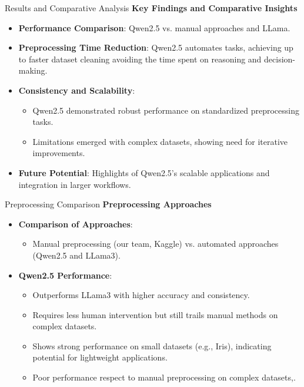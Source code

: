 \documentclass{beamer}
\begin{document}
\begin{frame}{Results and Comparative Analysis}
    \textbf{\textcolor{myBlue}{Key Findings and Comparative Insights}}
    \vspace{0.3cm}
    \begin{itemize}
        \item \textbf{Performance Comparison}: Qwen2.5 vs. manual approaches and LLama.
        \item \textbf{\textcolor{myAccent}{Preprocessing Time Reduction}}: Qwen2.5 automates tasks, achieving up to faster dataset cleaning avoiding the time spent on reasoning and decision-making.
        \item \textbf{\textcolor{myAccent}{Consistency and Scalability}}:
            \begin{itemize}
                \item Qwen2.5 demonstrated robust performance on standardized preprocessing tasks.
                \item Limitations emerged with complex datasets, showing need for iterative improvements.
            \end{itemize}
        \item \textbf{Future Potential}: Highlights of Qwen2.5's scalable applications and integration in larger workflows.
    \end{itemize}
\end{frame}

\begin{frame}{Preprocessing Comparison}
    \textbf{\textcolor{myBlue}{Preprocessing Approaches}}
    \vspace{0.3cm}
    \begin{itemize}
        \item \textbf{Comparison of Approaches}:
            \begin{itemize}
                \item Manual preprocessing (our team, Kaggle) vs. automated approaches (Qwen2.5 and LLama3).
            \end{itemize}
        \item \textbf{Qwen2.5 Performance}:
            \begin{itemize}
                \item Outperforms LLama3 with higher accuracy and consistency.
                \item Requires less human intervention but still trails manual methods on complex datasets.
                \item Shows strong performance on small datasets (e.g., Iris), indicating potential for lightweight applications.
                \item Poor performance respect to manual preprocessing on complex datasets,.
            \end{itemize}
    \end{itemize}
\end{frame}
\end{document}
